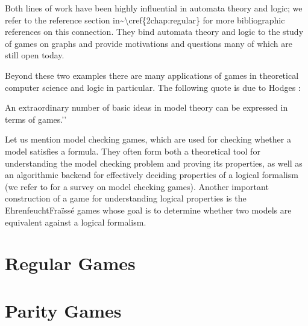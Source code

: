 \documentclass[letterpaper,10pt,english]{sphinxmanual}
\begin{document}
Both lines of work have been highly influential in automata theory and logic;
we refer to the reference section in\textasciitilde{}\textbackslash{}cref\{2\sphinxhyphen{}chap:regular\} for more bibliographic references on this connection.
They bind automata theory and logic to the study of games on graphs and provide motivations and questions many of which are still open today.

Beyond these two examples there are many applications of games in theoretical computer science and logic in particular.
The following quote is due to Hodges :

\textasciigrave{}\textasciigrave{}An extraordinary number of basic ideas in model theory can be expressed in terms of games.’’

Let us mention model checking games, which are used for checking whether a model satisfies a formula.
They often form both a theoretical tool for understanding the model checking problem and proving its properties, as well as an algorithmic backend for effectively deciding properties of a logical formalism (we refer to  for a survey on model checking games).
Another important construction of a game for understanding logical properties is the Ehrenfeucht\sphinxhyphen{}Fraïssé games  whose goal is to determine whether two models are equivalent against a logical formalism.




\chapter{Regular Games}
\label{\detokenize{2_Regular/main:regular-games}}\label{\detokenize{2_Regular/main:chap-regular}}\label{\detokenize{2_Regular/main::doc}}

\chapter{Parity Games}
\label{\detokenize{3_Parity/main:parity-games}}\label{\detokenize{3_Parity/main:chap-parity}}\label{\detokenize{3_Parity/main::doc}}
\end{document}
